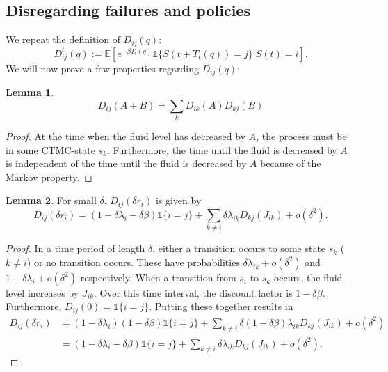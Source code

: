 \documentclass[a4paper]{thesis}
\theoremstyle{definition}
\newtheorem{lemma}{Lemma}[chapter]
\begin{document}
\subsection{Disregarding failures and policies}
We repeat the definition of $D_{ij}(q)$:
\[
D_{ij}^t(q):=\mathbb{E}[e^{-\beta T_t(q)}\mathds{1}\{S(t+T_t(q))=j\}|S(t)=i].
\]
We will now prove a few properties regarding $D_{ij}(q)$:
\begin{lemma}\label{lemma:MmfmDiscountsExponentLinear}
	\[
	D_{ij}(A+B)=\sum\limits_k D_{ik}(A)D_{kj}(B)
	\]
	\begin{proof}
		At the time when the fluid level has decreased by $A$, the process must be in some CTMC-state $s_k$.
		Furthermore, the time until the fluid is decreased by $A$ is independent of the time until the fluid is decreased by $A$ because of the Markov property.
	\end{proof}
\end{lemma}
\begin{lemma}\label{lemma:MmfmDiscountsInfinitisimal}
	For small $\delta$, $D_{ij}(\delta r_i)$ is given by
	\[
	D_{ij}(\delta r_i)=(1-\delta\lambda_i-\delta\beta)\mathds{1}\{i=j\}+\sum\limits_{k\neq i}\delta\lambda_{ik}D_{kj}(J_{ik})+o(\delta^2).
	\]
	\begin{proof}
		In a time period of length $\delta$, either a transition occurs to some state $s_k$ ($k\neq i$) or no transition occurs.
		These have probabilities $\delta\lambda_{ik}+o(\delta^2)$ and $1-\delta\lambda_i+o(\delta^2)$ respectively.
		When a transition from $s_i$ to $s_k$ occurs, the fluid level increases by $J_{ik}$.
		Over this time interval, the discount factor is $1-\delta\beta$.
		Furthermore, $D_{ij}(0)=\mathds{1}\{i=j\}$.
		Putting these together results in
		\[
		\begin{split}
		D_{ij}(\delta r_i)&=(1-\delta\lambda_i)(1-\delta\beta)\mathds{1}\{i=j\}+\sum\limits_{k\neq i}\delta(1-\delta\beta)\lambda_{ik}D_{kj}(J_{ik})+o(\delta^2)\\
		&=(1-\delta\lambda_i-\delta\beta)\mathds{1}\{i=j\}+\sum\limits_{k\neq i}\delta\lambda_{ik}D_{kj}(J_{ik})+o(\delta^2).
		\end{split}
		\]
	\end{proof}
\end{lemma}
\end{document}
